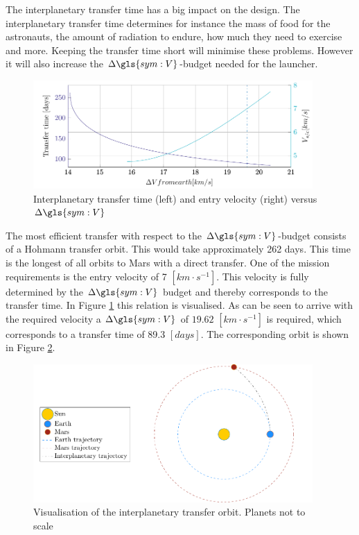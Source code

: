 The interplanetary transfer time has a big impact on the design. The interplanetary transfer time determines for instance the mass of food for the astronauts, the amount of radiation to endure, how much they need to exercise and more. Keeping the transfer time short will minimise these problems. However it will also increase the $\Delta\gls{sym:V}$-budget needed for the launcher. 

\begin{figure}[h]
	\centering
	\includegraphics[width=0.95\textwidth]{Figure/Inter_transfer/transfer_time.pdf}
	\caption[Interplanetary transfer time and entry velocity versus $\Delta\gls{sym:V}$]{Interplanetary transfer time (left) and entry velocity (right) versus $\Delta\gls{sym:V}$}
	\label{fig:inter_time}
\end{figure}

The most efficient transfer with respect to the $\Delta\gls{sym:V}$-budget consists of a Hohmann transfer orbit. This would take approximately 262 days. This time is the longest of all orbits to Mars with a direct transfer. One of the mission requirements is the entry velocity of 7 $\left[km \cdot s^{-1}\right]$. This velocity is fully determined by the $\Delta \gls{sym:V}$ budget and thereby corresponds to the transfer time. In Figure \ref{fig:inter_time} this relation is visualised. As can be seen to arrive with the required velocity a $\Delta \gls{sym:V}$ of $19.62$ $\left[km \cdot s^{-1}\right]$ is required, which corresponds to a transfer time of 89.3 $\left[days\right]$. The corresponding orbit is shown in Figure \ref{fig:inter_orbit}.

\begin{figure}[h]
	\centering
	\includegraphics[width=0.95\textwidth]{Figure/Inter_transfer/orbits.pdf}
	\caption[Visualisation of the interplanetary transfer orbit]{Visualisation of the interplanetary transfer orbit. Planets not to scale}
	\label{fig:inter_orbit}
\end{figure}
